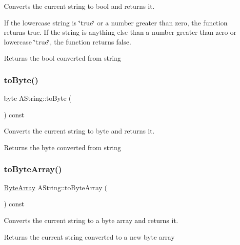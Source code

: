 Converts the current string to bool and returns it. 

If the lowercase string is \char`\"{}true\char`\"{} or a number greater than zero, the function returns true. If the string is anything else than a number greater than zero or lowercase \char`\"{}true\char`\"{}, the function returns false.

\begin{DoxyReturn}{Returns}
the bool converted from string 
\end{DoxyReturn}
\mbox{\label{class_a_string_a67f811fea214d958fe296fef79776bc1}} 
\subsubsection{\texorpdfstring{toByte()}{toByte()}}
{\footnotesize\ttfamily byte A\+String\+::to\+Byte (\begin{DoxyParamCaption}{ }\end{DoxyParamCaption}) const}



Converts the current string to byte and returns it. 

\begin{DoxyReturn}{Returns}
the byte converted from string 
\end{DoxyReturn}
\mbox{\label{class_a_string_ae9d0a67c87c20152d5ab770ad1b955ac}} 
\subsubsection{\texorpdfstring{toByteArray()}{toByteArray()}}
{\footnotesize\ttfamily \mbox{\hyperlink{class_byte_array}{Byte\+Array}} A\+String\+::to\+Byte\+Array (\begin{DoxyParamCaption}{ }\end{DoxyParamCaption}) const}



Converts the current string to a byte array and returns it. 

\begin{DoxyReturn}{Returns}
the current string converted to a new byte array 
\end{DoxyReturn}
\mbox{\label{class_a_string_a6cb34c26433abd7e75e0bdf9bb40ccba}} 
